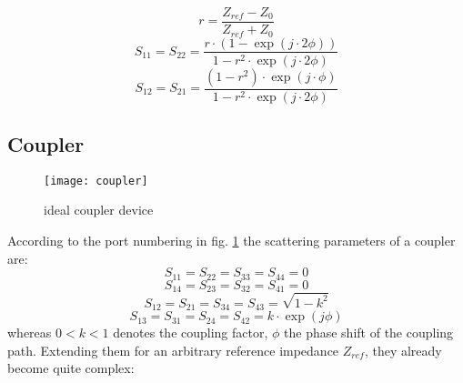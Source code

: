 \begin{equation}
r = \frac{Z_{ref}-Z_0}{Z_{ref}+Z_0}
\end{equation}
\begin{equation}
S_{11} = S_{22} = \frac{r\cdot\left(1-\exp\left(j\cdot 2\phi\right)\right)}{1-r^2\cdot\exp\left(j\cdot 2\phi\right)}
\end{equation}
\begin{equation}
S_{12} = S_{21} = \frac{(1-r^2)\cdot\exp\left(j\cdot\phi\right)}{1-r^2\cdot\exp\left(j\cdot 2\phi\right)}
\end{equation}

\subsection{Coupler}

\begin{figure}[ht]
\begin{center}
\texttt{[image: coupler]}
\end{center}
\caption{ideal coupler device}
\label{fig:coupler}
\end{figure}
\FloatBarrier

According to the port numbering in fig. \ref{fig:coupler} the
scattering parameters of a coupler are:
\begin{equation}
S_{11} = S_{22} = S_{33} = S_{44} = 0
\end{equation}
\begin{equation}
S_{14} = S_{23} = S_{32} = S_{41} = 0
\end{equation}
\begin{equation}
S_{12} = S_{21} = S_{34} = S_{43} = \sqrt{1-k^2}
\end{equation}
\begin{equation}
S_{13} = S_{31} = S_{24} = S_{42} = k\cdot \exp\left(j\phi\right)
\end{equation}
whereas $0<k<1$ denotes the coupling factor, $\phi$ the phase shift of
the coupling path.  Extending them for an arbitrary reference
impedance $Z_{ref}$, they already become quite complex:

